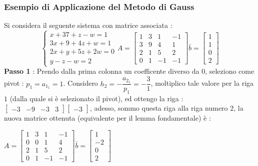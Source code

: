 \documentclass[12pt, letterpaper]{article}
\begin{document}
\subsubsection{Esempio di Applicazione del Metodo di Gauss}
Si considera il seguente sistema con matrice associata : \begin{equation}
    \begin{cases}
        x+37+z-w=1\\
        3x+9+4z+w=1\\
        2x+y+5z+2w=0\\
        y-z-w=2
    \end{cases} A=\begin{bmatrix}
        1&3&1&-1\\
        3&9&4&1\\
        2&1&5&2\\
        0&1&-1&-1
    \end{bmatrix}\bar b = \begin{bmatrix}
        1\\
        1\\
        0\\
        2
    \end{bmatrix}
\end{equation}
\textbf{Passo 1} : Prendo dalla prima colonna un coefficente diverso da 0, seleziono come 
pivot : \(p_1=a_{1_1}=1\). Considero \(h_2 = -\dfrac{a_{2_1}}{p_1}=-\dfrac{3}{1}\),  moltiplico tale valore per la 
riga \(1\) (dalla quale si è selezionato il pivot), ed ottengo la riga : \(\begin{bmatrix}
    -3&-9&-3&3
\end{bmatrix}\begin{bmatrix}
    -3
\end{bmatrix}\), adesso, sommo questa riga alla riga numero 2, la nuova matrice ottenuta (equivalente per 
il lemma fondamentale) è : \begin{center}\(
    A=\begin{bmatrix}
        1&3&1&-1\\
        0&0&1&4\\
        2&1&5&2\\
        0&1&-1&-1
    \end{bmatrix}\bar b = \begin{bmatrix}
        1\\
        -2\\
        0\\
        2
    \end{bmatrix}
\)\end{center}
\end{document}
